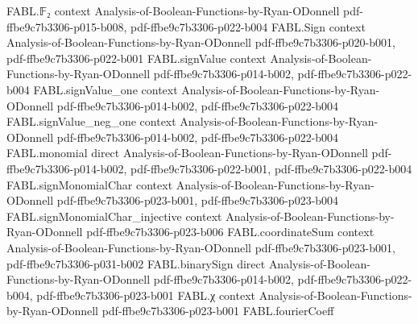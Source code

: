 \begin{theorem}
\label{FABL.expect_restrictedFourierWeightObservationFromInputs_eq_restrictedFourierWeight}
\leanok
{}
\proofstep
  {FABL.𝔽₂}
  {context}
  {Analysis-of-Boolean-Functions-by-Ryan-ODonnell}
  {pdf-ffbe9c7b3306-p015-b008,
    pdf-ffbe9c7b3306-p022-b004}
\proofstep
  {FABL.Sign}
  {context}
  {Analysis-of-Boolean-Functions-by-Ryan-ODonnell}
  {pdf-ffbe9c7b3306-p020-b001,
    pdf-ffbe9c7b3306-p022-b001}
\proofstep
  {FABL.signValue}
  {context}
  {Analysis-of-Boolean-Functions-by-Ryan-ODonnell}
  {pdf-ffbe9c7b3306-p014-b002,
    pdf-ffbe9c7b3306-p022-b004}
\proofstep
  {FABL.signValue_one}
  {context}
  {Analysis-of-Boolean-Functions-by-Ryan-ODonnell}
  {pdf-ffbe9c7b3306-p014-b002,
    pdf-ffbe9c7b3306-p022-b004}
\proofstep
  {FABL.signValue_neg_one}
  {context}
  {Analysis-of-Boolean-Functions-by-Ryan-ODonnell}
  {pdf-ffbe9c7b3306-p014-b002,
    pdf-ffbe9c7b3306-p022-b004}
\proofstep
  {FABL.monomial}
  {direct}
  {Analysis-of-Boolean-Functions-by-Ryan-ODonnell}
  {pdf-ffbe9c7b3306-p014-b002,
    pdf-ffbe9c7b3306-p022-b001,
    pdf-ffbe9c7b3306-p022-b004}
\proofstep
  {FABL.signMonomialChar}
  {context}
  {Analysis-of-Boolean-Functions-by-Ryan-ODonnell}
  {pdf-ffbe9c7b3306-p023-b001,
    pdf-ffbe9c7b3306-p023-b004}
\proofstep
  {FABL.signMonomialChar_injective}
  {context}
  {Analysis-of-Boolean-Functions-by-Ryan-ODonnell}
  {pdf-ffbe9c7b3306-p023-b006}
\proofstep
  {FABL.coordinateSum}
  {context}
  {Analysis-of-Boolean-Functions-by-Ryan-ODonnell}
  {pdf-ffbe9c7b3306-p023-b001,
    pdf-ffbe9c7b3306-p031-b002}
\proofstep
  {FABL.binarySign}
  {direct}
  {Analysis-of-Boolean-Functions-by-Ryan-ODonnell}
  {pdf-ffbe9c7b3306-p014-b002,
    pdf-ffbe9c7b3306-p022-b004,
    pdf-ffbe9c7b3306-p023-b001}
\proofstep
  {FABL.χ}
  {context}
  {Analysis-of-Boolean-Functions-by-Ryan-ODonnell}
  {pdf-ffbe9c7b3306-p023-b001}
\proofstep
  {FABL.fourierCoeff}

\end{theorem}
